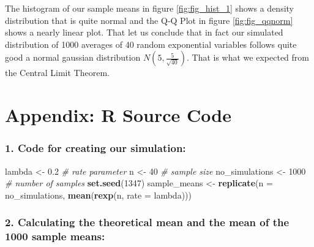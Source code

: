 \documentclass[]{article}
\newenvironment{Shaded}{\begin{snugshade}}{\end{snugshade}}
\newcommand{\KeywordTok}[1]{\textcolor[rgb]{0.13,0.29,0.53}{\textbf{#1}}}
\newcommand{\DataTypeTok}[1]{\textcolor[rgb]{0.13,0.29,0.53}{#1}}
\newcommand{\DecValTok}[1]{\textcolor[rgb]{0.00,0.00,0.81}{#1}}
\newcommand{\FloatTok}[1]{\textcolor[rgb]{0.00,0.00,0.81}{#1}}
\newcommand{\StringTok}[1]{\textcolor[rgb]{0.31,0.60,0.02}{#1}}
\newcommand{\CommentTok}[1]{\textcolor[rgb]{0.56,0.35,0.01}{\textit{#1}}}
\newcommand{\OperatorTok}[1]{\textcolor[rgb]{0.81,0.36,0.00}{\textbf{#1}}}
\newcommand{\NormalTok}[1]{#1}
\begin{document}
The histogram of our sample means in figure \ref{fig:fig_hist_1} shows a
density distribution that is quite normal and the Q-Q Plot in figure
\ref{fig:fig_qqnorm} shows a nearly linear plot. That let us conclude
that in fact our simulated distribution of 1000 averages of 40 random
exponential variables follows quite good a normal gaussian distribution
\({N}(5, \frac{5}{\sqrt{40}})\). That is what we expected from the
Central Limit Theorem.

\newpage

\section{Appendix: R Source Code}\label{appendix-r-source-code}

\hypertarget{Appendix_1}{\subsubsection{1. Code for creating our
simulation:}\label{Appendix_1}}

\begin{Shaded}
\begin{Highlighting}[]
\NormalTok{lambda <-}\StringTok{ }\FloatTok{0.2} \CommentTok{# rate parameter}
\NormalTok{n <-}\StringTok{ }\DecValTok{40} \CommentTok{# sample size}
\NormalTok{no_simulations <-}\StringTok{ }\DecValTok{1000} \CommentTok{# number of samples}
\KeywordTok{set.seed}\NormalTok{(}\DecValTok{1347}\NormalTok{)}
\NormalTok{sample_means <-}\StringTok{ }\KeywordTok{replicate}\NormalTok{(}\DataTypeTok{n =}\NormalTok{ no_simulations, }\KeywordTok{mean}\NormalTok{(}\KeywordTok{rexp}\NormalTok{(n, }\DataTypeTok{rate =}\NormalTok{ lambda)))}
\end{Highlighting}
\end{Shaded}

\hypertarget{Appendix_2}{\subsubsection{2. Calculating the theoretical
mean and the mean of the 1000 sample means:}\label{Appendix_2}}

\begin{Shaded}
\end{Shaded}
\end{document}
